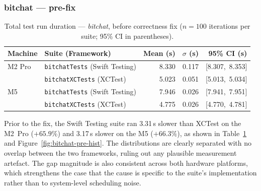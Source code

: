 \subsubsection*{bitchat --- pre-fix}

\begin{table}[ht]
    \centering
    \caption{%
        Total test run duration --- \textit{bitchat}, before correctness fix
        ($n = 100$ iterations per suite; 95\% CI in parentheses).%
    }
    \label{tab:perf-bitchat-pre}
    \begin{tabular}{llrrr}
        \toprule
        \textbf{Machine} & \textbf{Suite (Framework)} &
        \textbf{Mean (s)} & \textbf{$\sigma$ (s)} & \textbf{95\% CI (s)} \\
        \midrule
        M2 Pro & \texttt{bitchatTests} (Swift Testing)  & 8.330 & 0.117 & [8.307,\ 8.353] \\
               & \texttt{bitchatXCTests} (XCTest)        & 5.023 & 0.051 & [5.013,\ 5.034] \\
        \midrule
        M5     & \texttt{bitchatTests} (Swift Testing)  & 7.946 & 0.026 & [7.941,\ 7.951] \\
               & \texttt{bitchatXCTests} (XCTest)        & 4.775 & 0.026 & [4.770,\ 4.781] \\
        \bottomrule
    \end{tabular}
\end{table}

Prior to the fix, the Swift Testing suite ran 3.31\,s slower than XCTest on the M2~Pro
($+65.9\%$) and 3.17\,s slower on the M5 ($+66.3\%$), as shown in
Table~\ref{tab:perf-bitchat-pre} and Figure~\ref{fig:bitchat-pre-hist}. The
distributions are clearly separated with no overlap between the two frameworks,
ruling out any plausible measurement artefact. The gap magnitude is also consistent
across both hardware platforms, which strengthens the case that the cause is specific
to the suite's implementation rather than to system-level scheduling noise.

